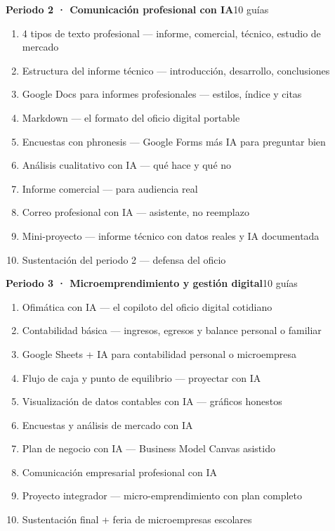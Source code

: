 \noindent\textbf{Periodo 2 · Comunicación profesional con IA}\hfill{\footnotesize\color{vinoInst}10 guías}\par
\begin{enumerate}[leftmargin=2.6em, itemsep=0.6pt, topsep=2pt, parsep=0pt, label=\footnotesize\arabic*.]
\footnotesize
  \item 4 tipos de texto profesional --- informe, comercial, técnico, estudio de mercado
  \item Estructura del informe técnico --- introducción, desarrollo, conclusiones
  \item Google Docs para informes profesionales --- estilos, índice y citas
  \item Markdown --- el formato del oficio digital portable
  \item Encuestas con phronesis --- Google Forms más IA para preguntar bien
  \item Análisis cualitativo con IA --- qué hace y qué no
  \item Informe comercial --- para audiencia real
  \item Correo profesional con IA --- asistente, no reemplazo
  \item Mini-proyecto --- informe técnico con datos reales y IA documentada
  \item Sustentación del periodo 2 --- defensa del oficio
\end{enumerate}

\noindent\textbf{Periodo 3 · Microemprendimiento y gestión digital}\hfill{\footnotesize\color{vinoInst}10 guías}\par
\begin{enumerate}[leftmargin=2.6em, itemsep=0.6pt, topsep=2pt, parsep=0pt, label=\footnotesize\arabic*.]
\footnotesize
  \item Ofimática con IA --- el copiloto del oficio digital cotidiano
  \item Contabilidad básica --- ingresos, egresos y balance personal o familiar
  \item Google Sheets + IA para contabilidad personal o microempresa
  \item Flujo de caja y punto de equilibrio --- proyectar con IA
  \item Visualización de datos contables con IA --- gráficos honestos
  \item Encuestas y análisis de mercado con IA
  \item Plan de negocio con IA --- Business Model Canvas asistido
  \item Comunicación empresarial profesional con IA
  \item Proyecto integrador --- micro-emprendimiento con plan completo
  \item Sustentación final + feria de microempresas escolares
\end{enumerate}

